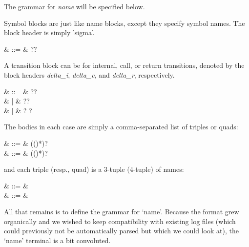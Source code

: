 The grammar for \textsl{name} will be specified below.


Symbol blocks are just like name blocks, except they specify symbol
names. The block header is simply 'sigma'.

\begin{grammar}
   & ::= & \cfgsp  \term{\{}?\cfgsp  {}\cfgsp  \term{\}}?
\end{grammar}

A transition block can be for internal, call, or return transitions,
denoted by the block headers \textsl{delta\_i}, \textsl{delta\_c}, and
\textsl{delta\_r}, respectively.
 
\begin{grammar}
   & ::= & \cfgsp  \term{\{}?\cfgsp  {}\cfgsp  \term{\}}? \\
                        &   | & \cfgsp  \term{\{}?\cfgsp  {}\cfgsp  \term{\}}? \\
                        &   | & \cfgsp  \term{\{}?\cfgsp  {}  \cfgsp  \term{\}}?
\end{grammar}

The bodies in each case are simply a comma-separated list of triples
or quads:

\begin{grammar}
   & ::= & (\cfgsp  (\term{,}\cfgsp  {})*)? \\
     & ::= & (\cfgsp  (\term{,}\cfgsp  {})*)?
\end{grammar}

and each triple (resp., quad) is a 3-tuple (4-tuple) of names:

\begin{grammar}
   & ::= &  \term{(}\cfgsp  {}\cfgsp \term{,}\cfgsp  {}\cfgsp  \term{,}\cfgsp  {}\cfgsp  \term{)} \\
   & ::= &  \term{(}\cfgsp  {}\cfgsp \term{,}\cfgsp  {}\cfgsp  \term{,}\cfgsp  {}\cfgsp  \term{,}\cfgsp  {}\cfgsp  \term{)}
\end{grammar}


All that remains is to define the grammar for `name'. Because the
format grew organically and we wished to keep compatibility with
existing log files (which could previously not be automatically parsed
but which we could look at), the `name' terminal is a bit convoluted.

